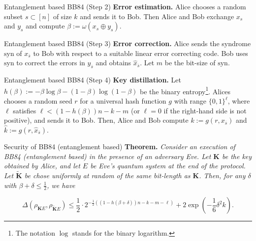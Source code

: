 \documentclass{beamer}
\begin{document}
\begin{frame}{Entanglement based BB84 (Step 2)}
\textbf{Error estimation.} Alice chooses a random subset $s\subset [n]$ of size $k$ and sends it to Bob. Then Alice and Bob exchange $x_s$ and $y_s$ and compute $\beta := \omega \left( x_s \oplus y_s\right)$.
\end{frame}

\begin{frame}{Entanglement based BB84 (Step 3)}
\textbf{Error correction.} Alice sends the syndrome $\text{syn}$ of $x_{\overline{s}}$ to Bob with respect to a suitable linear error correcting code. Bob uses $\text{syn}$ to correct the errors in $y_{\overline{s}}$ and obtains $\hat{x}_{\overline{s}}$. Let $m$ be the bit-size of $\text{syn}$.
\end{frame}

\begin{frame}{Entanglement based BB84 (Step 4)}
\textbf{Key distillation.} Let $h(\beta) := - \beta \log \beta - (1 - \beta) \log (1-\beta)$ be the binary entropy\footnote{The notation $\log$ stands for the binary logarithm.}. Alices chooses a random seed $r$ for a universal hash function $g$ with range $\{0, 1\}^{\ell}$, where $\ell$ satisfies $\ell < \left(1 - h(\beta)\right)n - k - m$ (or $\ell = 0$ if the right-hand side is not positive), and sends it to Bob. Then, Alice and Bob compute $k := g(r, x_{\overline{s}})$ and $\hat{k} := g(r, \hat{x}_{\overline{s}})$.
\end{frame}


\begin{frame}{Security of BB84 (entanglement based)}
\textbf{Theorem.} \emph{Consider an execution of BB84 (entanglement based) in the presence of an adversary Eve. Let $\mathbf{K}$ be the key obtained by Alice, and let $E$ be Eve's quantum system at the end of the protocol. Let $\mathbf{\tilde{K}}$ be chose uniformly at random of the same bit-length as $\mathbf{K}$. Then, for any $\delta$ with $\beta + \delta \leq \frac{1}{2}$, we have}

$$
\Delta\left(\rho_{\mathbf{K} E}, \rho_{\mathbf{\tilde{K}} E} \right) \leq \frac{1}{2}\cdot 2^{-\frac{1}{2}\left( (1 - h(\beta + \delta))n - k - m - \ell \right)} + 2 \exp\left( -\frac{1}{6}\delta^2 k\right).
$$
\end{frame}
\end{document}
